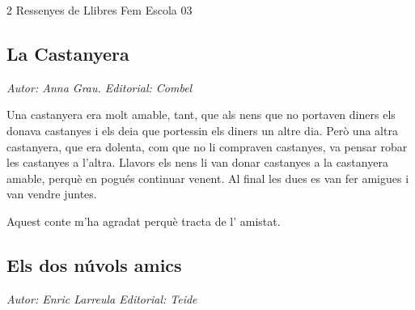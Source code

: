 \begin{news}
{2} %
{Ressenyes de Llibres}
{}
{Fem Escola}
{03} %



\subsection*{La Castanyera}

\noindent{}

\emph{Autor: Anna Grau.  Editorial: Combel}

Una castanyera era molt amable, tant, que als nens que no portaven diners els donava castanyes i els deia que portessin els diners un altre dia. Però una altra castanyera, que era dolenta, com que no li compraven castanyes, va pensar robar les castanyes a l’altra. Llavors els nens li van donar castanyes a la castanyera amable, perquè en pogués continuar venent. Al final les dues es van fer amigues i van vendre juntes.

Aquest conte m’ha agradat perquè tracta de l’ amistat.


\newpage

\subsection*{Els dos núvols amics}
\emph{Autor: Enric Larreula Editorial: Teide }

\noindent{}


\end{news}
